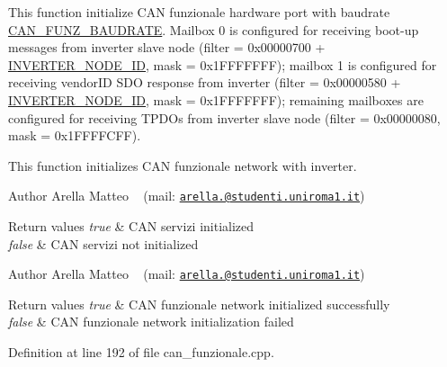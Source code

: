 This function initialize C\+AN funzionale hardware port with baudrate \mbox{\hyperlink{group___common__defines__group_gadee7e3800c996a5a977034531d94570d}{C\+A\+N\+\_\+\+F\+U\+N\+Z\+\_\+\+B\+A\+U\+D\+R\+A\+TE}}. Mailbox 0 is configured for receiving boot-\/up messages from inverter slave node (filter = 0x00000700 + \mbox{\hyperlink{group___c_a_n__funzionale__group_ga59ea82aec4abe07072cbdad555a8c1b9}{I\+N\+V\+E\+R\+T\+E\+R\+\_\+\+N\+O\+D\+E\+\_\+\+ID}}, mask = 0x1\+F\+F\+F\+F\+F\+FF); mailbox 1 is configured for receiving vendor\+ID S\+DO response from inverter (filter = 0x00000580 + \mbox{\hyperlink{group___c_a_n__funzionale__group_ga59ea82aec4abe07072cbdad555a8c1b9}{I\+N\+V\+E\+R\+T\+E\+R\+\_\+\+N\+O\+D\+E\+\_\+\+ID}}, mask = 0x1\+F\+F\+F\+F\+F\+FF); remaining mailboxes are configured for receiving T\+P\+D\+Os from inverter slave node (filter = 0x00000080, mask = 0x1\+F\+F\+F\+F\+C\+FF). 

This function initializes C\+AN funzionale network with inverter.

\begin{DoxyAuthor}{Author}
Arella Matteo ~\newline
 (mail\+: \href{mailto:arella.1646983@studenti.uniroma1.it}{\tt arella.@studenti.\+uniroma1.\+it})
\end{DoxyAuthor}

\begin{DoxyRetVals}{Return values}
{\em true} & C\+AN servizi initialized \\
\hline
{\em false} & C\+AN servizi not initialized\\
\hline
\end{DoxyRetVals}
\begin{DoxyAuthor}{Author}
Arella Matteo ~\newline
 (mail\+: \href{mailto:arella.1646983@studenti.uniroma1.it}{\tt arella.@studenti.\+uniroma1.\+it})
\end{DoxyAuthor}

\begin{DoxyRetVals}{Return values}
{\em true} & C\+AN funzionale network initialized successfully \\
\hline
{\em false} & C\+AN funzionale network initialization failed \\
\hline
\end{DoxyRetVals}


Definition at line 192 of file can\+\_\+funzionale.\+cpp.

\mbox{\label{group___c_a_n__funzionale__group_gaf1acdfa5537f47656edd6ffa3e7c24bd}} 
